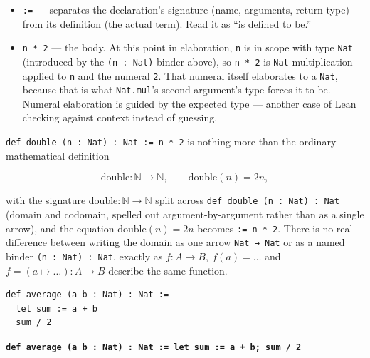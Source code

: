 \begin{itemize}
\item
  \texttt{:=} --- separates the declaration's signature (name, arguments, return type) from its definition (the actual term). Read it as ``is defined to be.''
\item
  \texttt{n * 2} --- the body. At this point in elaboration, \texttt{n} is in scope with type \texttt{Nat} (introduced by the \texttt{(n : Nat)} binder above), so \texttt{n * 2} is \texttt{Nat} multiplication applied to \texttt{n} and the numeral \texttt{2}. That numeral itself elaborates to a \texttt{Nat}, because that is what \texttt{Nat.mul}'s second argument's type forces it to be. Numeral elaboration is guided by the expected type --- another case of Lean checking against context instead of guessing.
\end{itemize}

\begin{mathreading}

\texttt{def double (n : Nat) : Nat := n * 2} is nothing more than the ordinary mathematical definition

\end{mathreading}

\[
\mathrm{double} : \mathbb{N} \to \mathbb{N}, \qquad \mathrm{double}(n) = 2n,
\]

with the signature \(\mathrm{double} : \mathbb{N} \to \mathbb{N}\) split across \texttt{def double (n : Nat) : Nat} (domain and codomain, spelled out argument-by-argument rather than as a single arrow), and the equation \(\mathrm{double}(n) = 2n\) becomes \texttt{:= n * 2}. There is no real difference between writing the domain as one arrow \texttt{Nat → Nat} or as a named binder \texttt{(n : Nat) : Nat}, exactly as \(f : A \to B,\ f(a) = \ldots\) and \(f = (a \mapsto \ldots) : A \to B\) describe the same function.

\begin{lstlisting}
def average (a b : Nat) : Nat :=
  let sum := a + b
  sum / 2
\end{lstlisting}

\textbf{\texttt{def average (a b : Nat) : Nat := let sum := a + b; sum /\allowbreak{} 2}}


